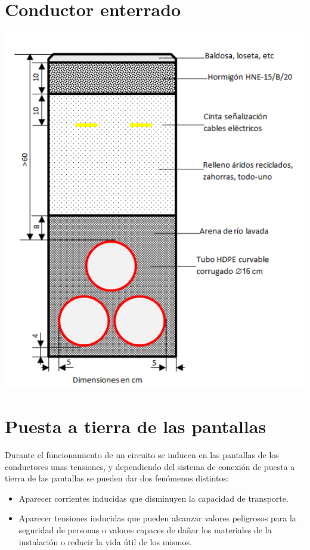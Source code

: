 \documentclass[10pt,a4paper]{article}
\begin{document}
\section{Conductor enterrado}
\begin{center}
    \includegraphics[scale = 0.6]{Captura de pantalla 2021-05-09 110303.png}
\end{center}

\section{Puesta a tierra de las pantallas}
Durante el funcionamiento de un circuito se inducen en las pantallas de los
conductores unas tensiones, y dependiendo del sistema de conexión de puesta a
tierra de las pantallas se pueden dar dos fenómenos distintos:
\begin{itemize}
    \item Aparecer corrientes inducidas que disminuyen la capacidad de transporte.
    \item Aparecer tensiones inducidas que pueden alcanzar valores peligrosos para la seguridad de personas o valores capaces de dañar los materiales de la instalación o reducir la vida útil de los mismos.
\end{itemize}
\end{document}
